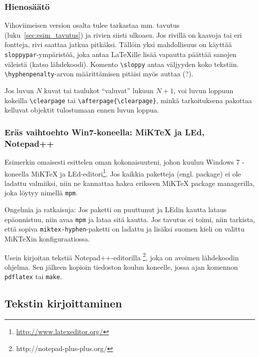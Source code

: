 \subsubsection{Hienosäätö}
\label{sec:hienos}

\begin{sloppypar}
  Vihoviimeisen version osalta tulee tarkastaa mm. tavutus
  (luku~\ref{sec:esim_tavutus}) ja rivien siisti ulkoasu.  Jos rivillä
  on kaavoja tai eri fontteja, rivi saattaa jatkua pitkäksi. Tällöin
  yksi mahdollisuus on käyttää \verb!sloppypar!-ympäristöä, joka antaa
  \LaTeX{}ille lisää vapautta päättää sanojen väleistä (katso
  lähdekoodi). Komento \verb!\sloppy! antaa väljyyden koko tekstiin.
  \verb!\hyphenpenalty!-arvon määrittämisen pitäisi myös
  auttaa (?).
\end{sloppypar}

Jos luvun $N$ kuvat tai taulukot ``valuvat'' lukuun $N+1$,
voi luvun loppuun kokeilla \verb!\clearpage! tai 
\verb!\afterpage{\clearpage}!, minkä tarkoituksena pakottaa
kelluvat objektit tulostumaan ennen luvun loppua.


\subsubsection{Eräs vaihtoehto Win7-koneella: MiKTeX ja LEd, Notepad++}
\label{sec:esimmiktex}

Esimerkin omaisesti esittelen oman kokonaisuuteni, johon kuuluu
Windows 7 -koneella MiKTeX ja
LEd-editori\footnote{\url{http://www.latexeditor.org/}}.  Jos kaikkia
paketteja (engl. package) ei ole ladattu valmiiksi, niin ne kannattaa
hakea erikseen MiKTeX package managerilla, joka löytyy nimellä
\verb!mpm!.

Ongelmia ja ratkaisuja: Jos paketti on puuttunut ja LEdin kautta
lataus epäonnistuu, niin avaa \verb!mpm! ja lataa sitä kautta.  Jos
tavutus ei toimi, niin tarkista, että sopiva
\verb!miktex-hyphen!-paketti on ladattu ja lisäksi suomen kieli on
valittu MiKTeXin konfiguraatiossa.

Usein kirjoitan tekstiä Notepad++-editorilla%
\footnote{http://notepad-plus-plus.org/}, joka on avoimen lähdekoodin
ohjelma. Sen jälkeen kopioin tiedoston koulun koneelle, jossa ajan
komennon \verb!pdflatex! tai \verb!make!.

\subsection{Tekstin kirjoittaminen}
\label{sec:esimmuotoilut}

